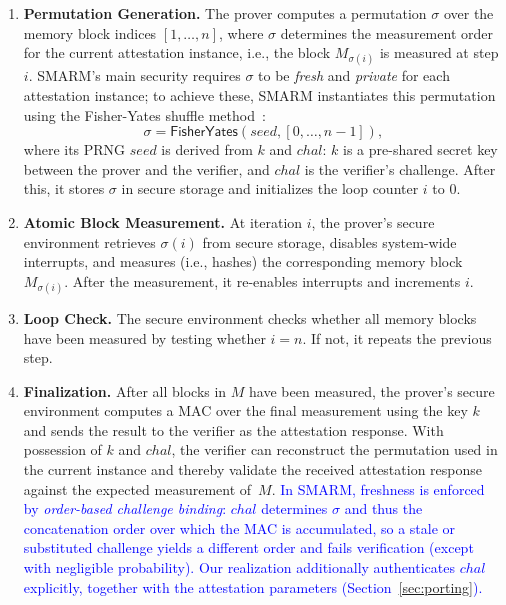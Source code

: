 \documentclass[journal]{IEEEtran}
\newcommand\ben[1]{\textcolor{blue}{#1}}
\begin{document}
\begin{enumerate}
    \item \textbf{Permutation Generation.}
    The prover computes a permutation $\sigma$ over the memory block indices $[1,\ldots,n]$, where $\sigma$ determines the measurement order for the current attestation instance, i.e., the block $M_{\sigma(i)}$ is measured at step $i$.
    SMARM's main security requires $\sigma$ to be \emph{fresh} and \emph{private} for each attestation instance;
    to achieve these, SMARM instantiates this permutation using the Fisher-Yates shuffle method~\cite{fisherYates}:
    \[
        \sigma = \mathsf{FisherYates}(seed, [0,\ldots,n-1]),
    \]
    where its PRNG $seed$ is derived from $k$ and $chal$: $k$ is a pre-shared secret key between the prover and the verifier, and $chal$ is the verifier’s challenge.
    After this, it stores $\sigma$ in secure storage and initializes the loop counter $i$ to $0$.

    \item \textbf{Atomic Block Measurement.}
    At iteration $i$, the prover's secure environment retrieves $\sigma(i)$ from secure storage, disables system-wide interrupts, and measures (i.e., hashes) the corresponding memory block $M_{\sigma(i)}$.
    After the measurement, it re-enables interrupts and increments $i$.

    \item \textbf{Loop Check.}
    The secure environment checks whether all memory blocks have been measured by testing whether $i = n$.
    If not, it repeats the previous step.

    \item \textbf{Finalization.}
    After all blocks in $M$ have been measured, the prover's secure environment computes a MAC over the final measurement using the key $k$ and sends the result to the verifier as the attestation response.
    With possession of $k$ and $chal$, the verifier can reconstruct the permutation used in the current instance and thereby validate the received attestation response against the expected measurement of~$M$. \ben{In SMARM, freshness is enforced by \emph{order-based challenge binding}: $chal$ determines $\sigma$ and thus the concatenation order over which the MAC is accumulated, so a stale or substituted challenge yields a different order and fails verification (except with negligible probability).
    Our realization additionally authenticates $chal$ explicitly, together with the attestation parameters (Section~\ref{sec:porting}).}

\end{enumerate}
\end{document}

